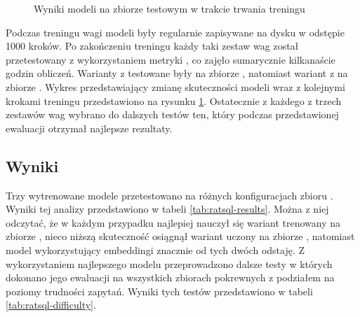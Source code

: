 \begin{figure}[ht]
  \begin{center}
    \caption{Wyniki modeli na zbiorze testowym w trakcie trwania treningu}
    \label{plot:ratsql-accuracy}
  \end{center}
\end{figure}

Podczas treningu wagi modeli były regularnie zapisywane na dysku w odstępie 1000 kroków. Po zakończeniu treningu każdy taki zestaw wag został przetestowany z wykorzystaniem metryki , co zajęło sumarycznie kilkanaście godzin obliczeń. Warianty z  testowane były na zbiorze , natomiast wariant z  na zbiorze . Wykres przedstawiający zmianę skuteczności modeli wraz z kolejnymi krokami treningu przedstawiono na rysunku \ref{plot:ratsql-accuracy}. Ostatecznie z każdego z trzech zestawów wag wybrano do dalszych testów ten, który podczas przedstawionej ewaluacji otrzymał najlepsze rezultaty. 

\subsection{Wyniki}
Trzy wytrenowane modele przetestowano na różnych konfiguracjach zbioru . Wyniki tej analizy przedstawiono w tabeli \ref{tab:ratsql-results}. Można z niej odczytać, że w każdym przypadku najlepiej nauczył się wariant  trenowany na zbiorze , nieco niższą skuteczność osiągnął wariant  uczony na zbiorze , natomiast model wykorzystujący embeddingi  znacznie od tych dwóch odstaję. Z wykorzystaniem najlepszego modelu przeprowadzono dalsze testy w których dokonano jego ewaluacji na wszystkich zbiorach pokrewnych z podziałem na poziomy trudności zapytań. Wyniki tych testów przedstawiono w tabeli \ref{tab:ratsql-difficulty}.

